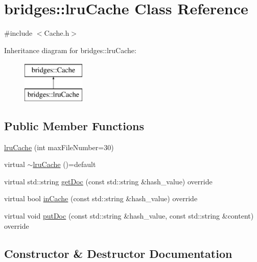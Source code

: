 \hypertarget{classbridges_1_1lru_cache}{}\section{bridges\+:\+:lru\+Cache Class Reference}
\label{classbridges_1_1lru_cache}


{\ttfamily \#include $<$Cache.\+h$>$}

Inheritance diagram for bridges\+:\+:lru\+Cache\+:\begin{figure}[H]
\begin{center}
\leavevmode
\includegraphics[height=2.000000cm]{classbridges_1_1lru_cache}
\end{center}
\end{figure}
\subsection*{Public Member Functions}
\begin{DoxyCompactItemize}
\item 
\hyperlink{classbridges_1_1lru_cache_ab21417b9fdc01613ec4ef3378c027593}{lru\+Cache} (int max\+File\+Number=30)
\item 
virtual \hyperlink{classbridges_1_1lru_cache_ab83a0a8e33baeacf9b22e33ea02b3a04}{$\sim$lru\+Cache} ()=default
\item 
virtual std\+::string \hyperlink{classbridges_1_1lru_cache_ac8bed8ab7cbf002a23573c071ba04ad6}{get\+Doc} (const std\+::string \&hash\+\_\+value) override
\item 
virtual bool \hyperlink{classbridges_1_1lru_cache_ab56c75166ddcc3d17e6924e581f7a4e8}{in\+Cache} (const std\+::string \&hash\+\_\+value) override
\item 
virtual void \hyperlink{classbridges_1_1lru_cache_a927fa1186ba830717ce11898c2beb4c7}{put\+Doc} (const std\+::string \&hash\+\_\+value, const std\+::string \&content) override
\end{DoxyCompactItemize}


\subsection{Constructor \& Destructor Documentation}
\mbox{\label{classbridges_1_1lru_cache_ab21417b9fdc01613ec4ef3378c027593}} 

